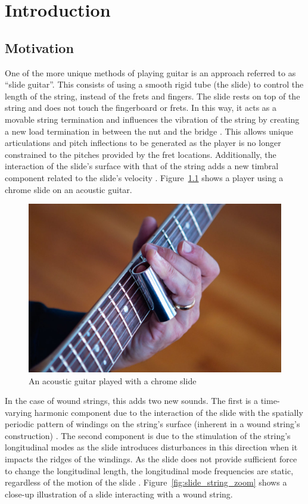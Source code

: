\documentclass[../main.tex]{subfiles}
\begin{document}
\chapter{Introduction}
\section{Motivation}
One of the more unique methods of playing guitar is an approach referred to as “slide guitar”. This consists of using a smooth rigid tube (the slide) to control the length of the string, instead of the frets and fingers. The slide rests on top of the string and does not touch the fingerboard or frets. In this way, it acts as a movable string termination and influences the vibration of the string by creating a new load termination in between the nut and the bridge . This allows unique articulations and pitch inflections to be generated as the player is no longer constrained to the pitches provided by the fret locations. Additionally, the interaction of the slide’s surface with that of the string adds a new timbral component related to the slide’s velocity . Figure~\ref{fig:acoustic_chrome} shows a player using a chrome slide on an acoustic guitar.

\begin{figure}[h]
    \centering
    \includegraphics[scale=.30]{./images/pictures/Slide-guitar-1024x683.jpg}
    \caption{An acoustic guitar played with a chrome slide}
    \label{fig:acoustic_chrome}
\end{figure}

In the case of wound strings, this adds two new sounds. The first is a time-varying harmonic component due to the interaction of the slide with the spatially periodic pattern of windings on the string’s surface (inherent in a wound string’s construction) . The second component is due to the stimulation of the string’s longitudinal modes as the slide introduces disturbances in this direction when it impacts the ridges of the windings. As the slide does not provide sufficient force to change the longitudinal length, the longitudinal mode frequencies are static, regardless of the motion of the slide . Figure~\ref{fig:slide_string_zoom} shows a close-up illustration of a slide interacting with a wound string.
\end{document}
